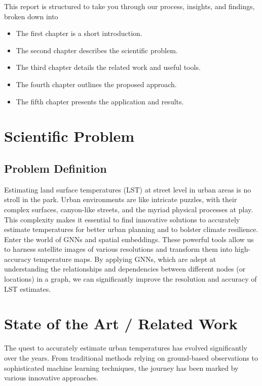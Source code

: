 \documentclass[runningheads,a4paper,11pt]{report}
\begin{document}
This report is structured to take you through our process, insights, and findings, broken down into 
\begin{itemize}
    \item The first chapter is a short introduction.
    \item The second chapter describes the scientific problem.
    \item The third chapter details the related work and useful tools.
    \item The fourth chapter outlines the proposed approach.
    \item The fifth chapter presents the application and results.
\end{itemize}



\chapter{Scientific Problem}
\label{section:scientificProblem}

\section{Problem Definition}
\label{section:problemDefinition}

Estimating land surface temperatures (LST) at street level in urban areas is no stroll in the park. Urban environments are like intricate puzzles, with their complex surfaces, canyon-like streets, and the myriad physical processes at play. This complexity makes it essential to find innovative solutions to accurately estimate temperatures for better urban planning and to bolster climate resilience.\\
Enter the world of GNNs and spatial embeddings. These powerful tools allow us to harness satellite images of various resolutions and transform them into high-accuracy temperature maps. By applying GNNs, which are adept at understanding the relationships and dependencies between different nodes (or locations) in a graph, we can significantly improve the resolution and accuracy of LST estimates.




\chapter{State of the Art / Related Work}\label{chapter:stateOfArt}

The quest to accurately estimate urban temperatures has evolved significantly over the years. From traditional methods relying on ground-based observations to sophisticated machine learning techniques, the journey has been marked by various innovative approaches.
\end{document}
